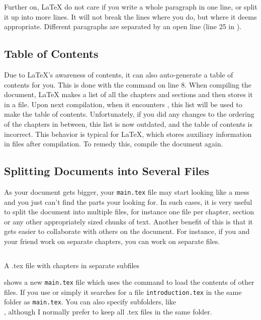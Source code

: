 {Further on, \LaTeX{} do not care if you write a whole paragraph in one line, or split it up into more lines. It will not break the lines where you do, but where it deems appropriate. Different paragraphs are separated by an open line (line 25 in ). 

\subsection{Table of Contents}
\index{\latexin{\tableofcontents}}
Due to \LaTeX{}'s awareness of contents, it can also auto-generate a table of contents for you. This is done with the \latexin{\tableofcontents} command on line 8. When compiling the document, \LaTeX{} makes a list of all the chapters and sections and then stores it in a file. Upon next compilation, when it encounters \latexin{\tableofcontents}, this list will be used to make the table of contents. Unfortunately, if you did any changes to the ordering of the chapters in between, this list is now outdated, and the table of contents is incorrect. This behavior is typical for \LaTeX{}, which stores auxiliary information in files after compilation. To remedy this, compile the document again.

\subsection{Splitting Documents into Several Files}
As your document gets bigger, your \verb|main.tex| file may start looking like a mess and you just can't find the parts your looking for. In such cases, it is very useful to split the document into multiple files, for instance one file per chapter, section or any other appropriately sized chunks of text. Another benefit of this is that it gets easier to collaborate with others on the document. For instance, if you and your friend work on separate chapters, you can work on separate files.

\begin{listing}
	\inputminted[frame=lines,linenos]{latex}{latex/multifiles.tex}
	\caption{A .tex file with chapters in separate subfiles}
	\label{lst:latex:multifiles}
\end{listing}

 shows a new \verb|main.tex| file which uses the \latexin{} command to load the contents of other files. If you use \latexin{} or simply \latexin{} it searches for a file \verb|introduction.tex| in the same folder as \verb|main.tex|. You can also specify subfolders, like\\ \latexin{}, although I normally prefer to keep all .tex files in the same folder.

}
